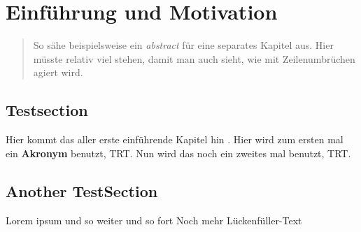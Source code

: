 


\chapter{Einführung und Motivation}

\begin{quote}
    So sähe beispielsweise ein \textit{abstract} für eine separates Kapitel aus. Hier müsste relativ viel stehen, damit man
    auch sieht, wie mit Zeilenumbrüchen agiert wird.
\end{quote}


\section{Testsection}
Hier kommt das aller erste einführende Kapitel hin \cite{fitzgerald:realigning_research_and_practice}.
Hier wird zum ersten mal ein \textbf{Akronym} benutzt, \ac{TRT}. Nun wird das noch ein zweites mal benutzt, \ac{TRT}.

\section{Another TestSection}
Lorem ipsum und so weiter und so fort
Noch mehr Lückenfüller-Text

